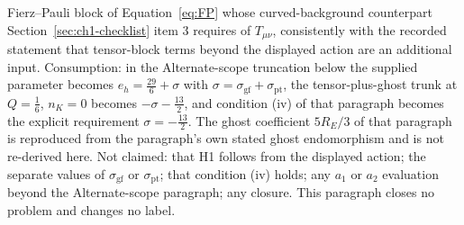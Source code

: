 Fierz--Pauli block of Equation~\eqref{eq:FP} whose curved-background counterpart Section~\ref{sec:ch1-checklist} item 3 requires of \(T_{\mu\nu}\), consistently with the recorded statement that tensor-block terms beyond the displayed action are an additional input. Consumption: in the Alternate-scope truncation below the supplied parameter becomes \(e_h=\tfrac{29}{6}+\sigma\) with \(\sigma=\sigma_{\mathrm{gf}}+\sigma_{\mathrm{pt}}\), the tensor-plus-ghost trunk at \(Q=\tfrac16\), \(n_K=0\) becomes \(-\sigma-\tfrac{13}{2}\), and condition (iv) of that paragraph becomes the explicit requirement \(\sigma=-\tfrac{13}{2}\). The ghost coefficient \(5R_E/3\) of that paragraph is reproduced from the paragraph's own stated ghost endomorphism and is not re-derived here. Not claimed: that H1 follows from the displayed action; the separate values of \(\sigma_{\mathrm{gf}}\) or \(\sigma_{\mathrm{pt}}\); that condition (iv) holds; any \(a_1\) or \(a_2\) evaluation beyond the Alternate-scope paragraph; any closure. This paragraph closes no problem and changes no label.

